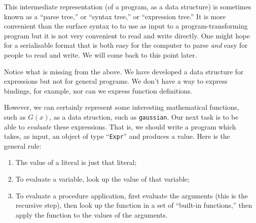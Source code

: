 \documentclass[11pt, a4paper]{article}
\newcommand{\cd}[1]{\texttt{#1}}
\begin{document}
This intermediate representation (of a program, as a data structure)
is sometimes known as a ``parse tree,'' or ``syntax tree,'' or
``expression tree.'' It is more convenient than the surface syntax to
to use as input to a program-transforming program but it is not very
convenient to read and write directly. One might hope for a
serialisable format that is both easy for the computer to parse
\emph{and} easy for people to read and write. We will come back to
this point later.

Notice what is missing from the above. We have developed a data
structure for expressions but not for general programs. We don't have
a way to express bindings, for example, nor can we express function
definitions.

However, we can certainly represent some interesting mathematical
functions, such as $G(x)$, as a data struction, such as
\cd{gaussian}. Our next task is to be able to \emph{evaluate} these
expressions. That is, we should write a program which takes, as input,
an object of type ``\cd{Expr}'' and produces a value. Here is the
general rule:
\begin{enumerate}
\item The value of a literal is just that literal;
\item To evaluate a variable, look up the value of that variable;
\item To evaluate a procedure application, first evaluate the
  arguments (this is the recursive step), then look up the function
  in a set of ``built-in functions,'' then apply the function to the
  values of the arguments.
\end{enumerate}
\end{document}
